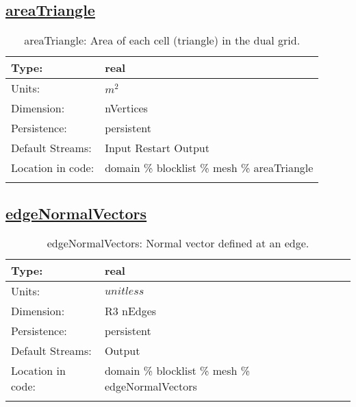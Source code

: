 \subsection[areaTriangle]{\hyperref[sec:var_tab_mesh]{areaTriangle}}
\label{subsec:var_sec_mesh_areaTriangle}
\begin{center}
\begin{longtable}{| p{2.0in} | p{4.0in} |}
        \hline 
        Type: & real \\
        \hline 
        Units: & $m^2$ \\
        \hline 
        Dimension: & nVertices \\
        \hline 
        Persistence: & persistent \\
        \hline 
		 Default Streams: & Input Restart Output  \\
        \hline 
		 Location in code: & domain \% blocklist \% mesh \% areaTriangle \\
		 \hline 
    \caption{areaTriangle: Area of each cell (triangle) in the dual grid.}
\end{longtable}
\end{center}
\subsection[edgeNormalVectors]{\hyperref[sec:var_tab_mesh]{edgeNormalVectors}}
\label{subsec:var_sec_mesh_edgeNormalVectors}
\begin{center}
\begin{longtable}{| p{2.0in} | p{4.0in} |}
        \hline 
        Type: & real \\
        \hline 
        Units: & $unitless$ \\
        \hline 
        Dimension: & R3 nEdges \\
        \hline 
        Persistence: & persistent \\
        \hline 
		 Default Streams: & Output  \\
        \hline 
		 Location in code: & domain \% blocklist \% mesh \% edgeNormalVectors \\
		 \hline 
    \caption{edgeNormalVectors: Normal vector defined at an edge.}
\end{longtable}
\end{center}

